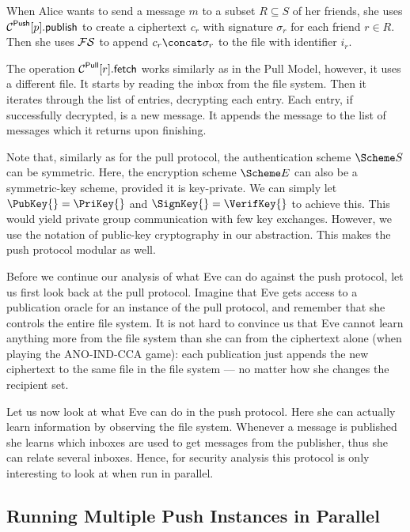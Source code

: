 When Alice wants to send a message \(m\) to a subset \(R\subseteq S\) of her 
friends, she uses \(\pnpub{p}\) to create a ciphertext \(c_r\) with signature 
\(\sigma_r\) for each friend \(r\in R\).
Then she uses \(\FS\) to append \(c_r\concat \sigma_r\) to the file with 
identifier \(i_r\).

The operation \(\pget{r}\) works similarly as in the Pull Model, however, it 
uses a different file.
It starts by reading the inbox from the file system.
Then it iterates through the list of entries, decrypting each entry.
Each entry, if successfully decrypted, is a new message.
It appends the message to the list of messages which it returns upon 
finishing.

Note that, similarly as for the pull protocol, the authentication scheme \(\S\) 
can be symmetric.
Here, the encryption scheme \(\E\) can also be a symmetric-key scheme, provided 
it is key-private.
We can simply let \(\PubKey{} = \PriKey{}\) and \(\SignKey{} = \VerifKey{}\) to 
achieve this.
This would yield private group communication with few key exchanges.
However, we use the notation of public-key cryptography in our abstraction.
This makes the push protocol modular as well.

Before we continue our analysis of what Eve can do against the push protocol, 
let us first look back at the pull protocol.
Imagine that Eve gets access to a publication oracle for an instance of the 
pull protocol, and remember that she controls the entire file system.
It is not hard to convince us that Eve cannot learn anything more from the file
system than she can from the ciphertext alone (when playing the ANO-IND-CCA 
game): each publication just appends the new ciphertext to the same file in the
file system --- no matter how she changes the recipient set.

Let us now look at what Eve can do in the push protocol.
Here she can actually learn information by observing the file system.
Whenever a message is published she learns which inboxes are used to get 
messages from the publisher, thus she can relate several inboxes.
Hence, for security analysis this protocol is only interesting to look at when 
run in parallel.

\subsection{Running Multiple Push Instances in Parallel}
\label{ParallelPush}

